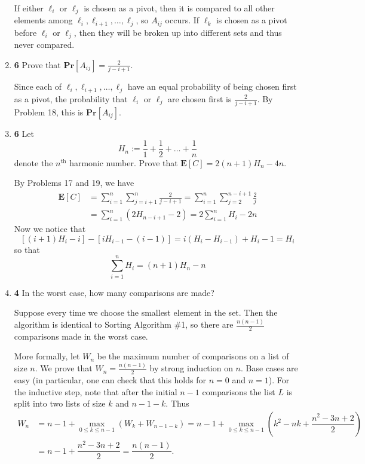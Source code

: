 \documentclass[12pt]{article}
\theoremstyle{plain}
\theoremstyle{definition}
\theoremstyle{remark}
\renewcommand{\Pr}{\textbf{Pr}}
\newcommand{\E}{\textbf{E}}
\newcommand{\pts}[1]{\lbrack\textbf{#1}\rbrack}
\begin{document}
\begin{enumerate}
\begin{tcolorbox}
If either $\ell_i$ or $\ell_j$ is chosen as a pivot, then it is compared to all other elements among $\ell_i,\ell_{i+1},\dots,\ell_j$, so $A_{ij}$ occurs. If $\ell_k$ is chosen as a pivot before $\ell_i$ or $\ell_j$, then they will be broken up into different sets and thus never compared.
\end{tcolorbox}

\item \pts{6} Prove that $\Pr[A_{ij}]=\frac2{j-i+1}$.

\begin{tcolorbox}
Since each of $\ell_i,\ell_{i+1},\dots,\ell_j$ have an equal probability of being chosen first as a pivot, the probability that $\ell_i$ or $\ell_j$ are chosen first is $\frac2{j-i+1}$. By Problem 18, this is $\Pr[A_{ij}]$.
\end{tcolorbox}

\item \pts{6} Let \[H_n:=\frac11+\frac12+\dots+\frac1n\] denote the $n^{\text{th}}$ harmonic number. Prove that $\E[C]=2(n+1)H_n-4n$.

\begin{tcolorbox}
By Problems 17 and 19, we have \begin{align*}\E[C]&=\sum_{i=1}^n\sum_{j=i+1}^n\frac2{j-i+1}=\sum_{i=1}^n\sum_{j=2}^{n-i+1}\frac2j\\&=\sum_{i=1}^n(2H_{n-i+1}-2)=2\sum_{i=1}^nH_i-2n\end{align*} Now we notice that \[[(i+1)H_i-i]-[iH_{i-1}-(i-1)]=i(H_i-H_{i-1})+H_i-1=H_i\] so that \[\sum_{i=1}^nH_i=(n+1)H_n-n\]
\end{tcolorbox}

\item \pts{4} In the worst case, how many comparisons are made?

\begin{tcolorbox}
Suppose every time we choose the smallest element in the set. Then the algorithm is identical to Sorting Algorithm \#1, so there are $\frac{n(n-1)}2$ comparisons made in the worst case.

\par More formally, let $W_n$ be the maximum number of comparisons on a list of size $n$.  We prove that $W_n=\tfrac{n(n-1)}2$ by strong induction on $n$.  Base cases are easy (in particular, one can check that this holds for $n=0$ and $n=1$).  For the inductive step, note that after the initial $n-1$ comparisons the list $L$ is split into two lists of size $k$ and $n-1-k$.  Thus \begin{align*}W_n &= n-1 + \max_{0\leq k\leq n-1}\left(W_k + W_{n-1-k}\right) = n-1 + \max_{0\leq k \leq n-1}\left(k^2-nk+\dfrac{n^2-3n+2}2\right) \\&= n-1 + \dfrac{n^2-3n+2}2 = \dfrac{n(n-1)}2.\end{align*}
\end{tcolorbox}


\end{enumerate}
\end{document}

